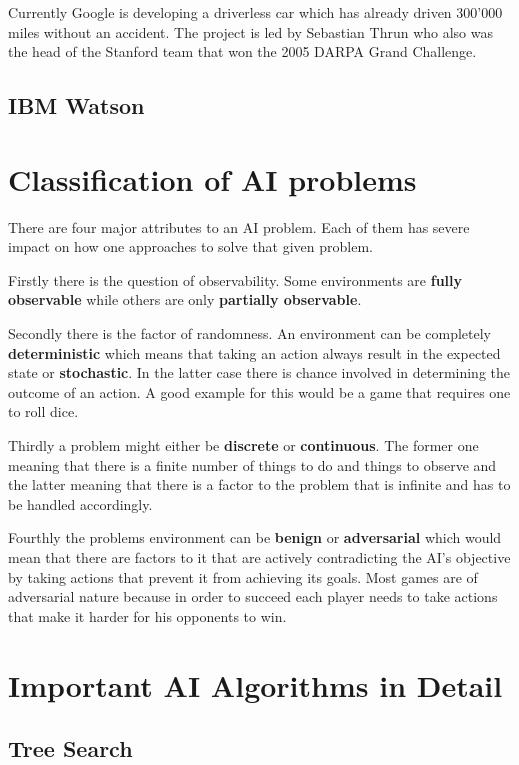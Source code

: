 Currently Google is developing a driverless car which has already driven 300'000 miles without an accident. The project is led by Sebastian Thrun who also was the head of the Stanford team that won the 2005 DARPA Grand Challenge.

\subsection{IBM Watson}

\section{Classification of AI problems}

There are four major attributes to an AI problem. Each of them has severe impact on how one approaches to solve that given problem.
\begin{description}
\item Firstly there is the question of observability. Some environments are {\bf fully observable} while others are only {\bf partially observable}.
\item Secondly there is the factor of randomness. An environment can be completely {\bf deterministic} which means that taking an action always result in the expected state or {\bf stochastic}. In the latter case there is chance involved in determining the outcome of an action. A good example for this would be a game that requires one to roll dice.
\item Thirdly a problem might either be {\bf discrete} or {\bf continuous}. The former one meaning that there is a finite number of things to do and things to observe and the latter meaning that there is a factor to the problem that is infinite and has to be handled accordingly.
\item Fourthly the problems environment can be {\bf benign} or {\bf adversarial} which would mean that there are factors to it that are actively contradicting the AI's objective by taking actions that prevent it from achieving its goals. Most games are of adversarial nature because in order to succeed each player needs to take actions that make it harder for his opponents to win.
\end{description}

\newpage
\section{Important AI Algorithms in Detail}
\subsection{Tree Search}

